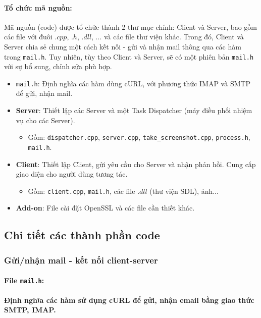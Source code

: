 \paragraph{Tổ chức mã nguồn:}{Mã nguồn (code) được tổ chức thành 2 thư mục chính: Client và Server, bao gồm các file với đuôi $.cpp$, $.h$, $.dll$, ... và các file thư viện khác. Trong đó, Client và Server chia sẻ chung một cách kết nối - gửi và nhận mail thông qua các hàm trong \texttt{mail.h}. Tuy nhiên, tùy theo Client và Server, sẽ có một phiên bản \texttt{mail.h} với sự bổ sung, chỉnh sửa phù hợp. }
\begin{itemize}
    \item \texttt{mail.h}: Định nghĩa các hàm dùng cURL, với phương thức IMAP và SMTP để gửi, nhận mail.
    \item \textbf{Server}: Thiết lập các Server và một Task Dispatcher (máy điều phối nhiệm vụ cho các Server).
    \begin{itemize}
        \item Gồm: \texttt{dispatcher.cpp}, \texttt{server.cpp}, \texttt{take\_screenshot.cpp}, \texttt{process.h}, \texttt{mail.h}.
    \end{itemize}
    
    \item \textbf{Client}: Thiết lập Client, gửi yêu cầu cho Server và nhận phản hồi. Cung cấp giao diện cho người dùng tương tác.
    \begin{itemize}
        \item Gồm: \texttt{client.cpp}, \texttt{mail.h}, các file $.dll$ (thư viện SDL), ảnh...
    \end{itemize}

    \item \textbf{Add-on}: File cài đặt OpenSSL và các file cần thiết khác.
\end{itemize}


\subsection{Chi tiết các thành phần code}

\subsubsection{Gửi/nhận mail - kết nối client-server}

\paragraph{File \texttt{mail.h}:}{\textbf{Định nghĩa các hàm sử dụng cURL để gửi, nhận email bằng giao thức SMTP, IMAP.}}

